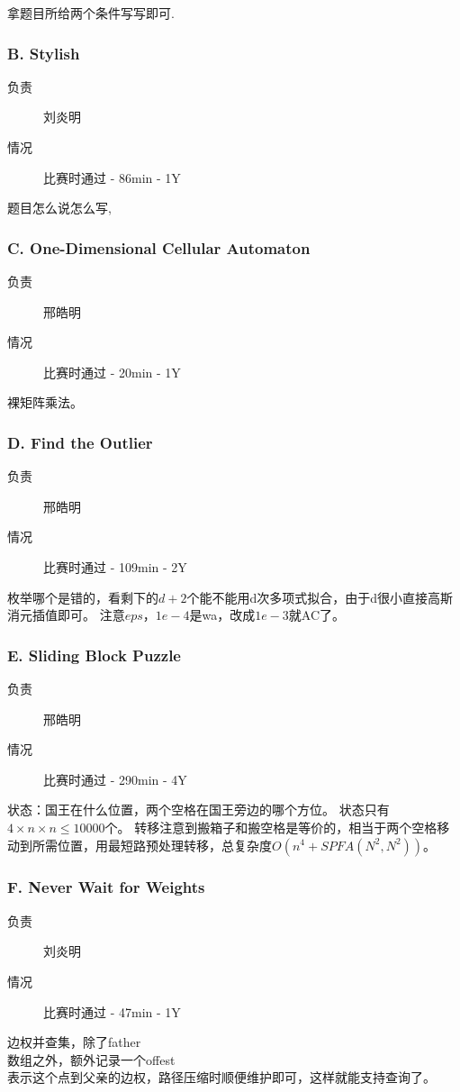 \documentclass[a4paper, 11pt, nofonts, nocap, fancyhdr]{ctexart}
\newcommand{\problem}[1]{\subsubsection{#1}}
\begin{document}
拿题目所给两个条件写写即可.

\problem{B. Stylish}

\begin{description}
\item[负责] 刘炎明
\item[情况] 比赛时通过 - 86min - 1Y
\end{description}

题目怎么说怎么写,

\problem{C. One-Dimensional Cellular Automaton}

\begin{description}
\item[负责] 邢皓明
\item[情况] 比赛时通过 - 20min - 1Y
\end{description}

裸矩阵乘法。

\problem{D. Find the Outlier}

\begin{description}
\item[负责] 邢皓明
\item[情况] 比赛时通过 - 109min - 2Y
\end{description}

枚举哪个是错的，看剩下的$d+2$个能不能用d次多项式拟合，由于d很小直接高斯消元插值即可。
注意$eps$，$1e-4$是wa，改成$1e-3$就AC了。

\problem{E. Sliding Block Puzzle}

\begin{description}
\item[负责] 邢皓明
\item[情况] 比赛时通过 - 290min - 4Y
\end{description}

状态：国王在什么位置，两个空格在国王旁边的哪个方位。
状态只有$4 \times n \times n\leq10000$个。
转移注意到搬箱子和搬空格是等价的，相当于两个空格移动到所需位置，用最短路预处理转移，总复杂度$O(n^4 + SPFA(N^2,N^2))$。

\problem{F. Never Wait for Weights}

\begin{description}
\item[负责] 刘炎明
\item[情况] 比赛时通过 - 47min - 1Y
\end{description}

边权并查集，除了father\[\]数组之外，额外记录一个offest\[\]表示这个点到父亲的边权，路径压缩时顺便维护即可，这样就能支持查询了。
\end{document}
